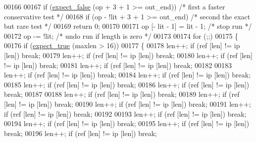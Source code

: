 \begin{DoxyCode}
00166 
00167           \textcolor{keywordflow}{if} (\hyperlink{lzf__c_8c_afc5fc140e1c36b6f0d3fc1699b038792}{expect\_false} (op + 3 + 1 >= out\_end)) \textcolor{comment}{/* first a faster conservative test */}
00168             \textcolor{keywordflow}{if} (op - !lit + 3 + 1 >= out\_end) \textcolor{comment}{/* second the exact but rare test */}
00169               \textcolor{keywordflow}{return} 0;
00170 
00171           op [- lit - 1] = lit - 1; \textcolor{comment}{/* stop run */}
00172           op -= !lit; \textcolor{comment}{/* undo run if length is zero */}
00173 
00174           \textcolor{keywordflow}{for} (;;)
00175             \{
00176               \textcolor{keywordflow}{if} (\hyperlink{lzf__c_8c_a6a6f76fb42528022b1fc8f9a1862e450}{expect\_true} (maxlen > 16))
00177                 \{
00178                   len++; \textcolor{keywordflow}{if} (ref [len] != ip [len]) \textcolor{keywordflow}{break};
00179                   len++; \textcolor{keywordflow}{if} (ref [len] != ip [len]) \textcolor{keywordflow}{break};
00180                   len++; \textcolor{keywordflow}{if} (ref [len] != ip [len]) \textcolor{keywordflow}{break};
00181                   len++; \textcolor{keywordflow}{if} (ref [len] != ip [len]) \textcolor{keywordflow}{break};
00182 
00183                   len++; \textcolor{keywordflow}{if} (ref [len] != ip [len]) \textcolor{keywordflow}{break};
00184                   len++; \textcolor{keywordflow}{if} (ref [len] != ip [len]) \textcolor{keywordflow}{break};
00185                   len++; \textcolor{keywordflow}{if} (ref [len] != ip [len]) \textcolor{keywordflow}{break};
00186                   len++; \textcolor{keywordflow}{if} (ref [len] != ip [len]) \textcolor{keywordflow}{break};
00187 
00188                   len++; \textcolor{keywordflow}{if} (ref [len] != ip [len]) \textcolor{keywordflow}{break};
00189                   len++; \textcolor{keywordflow}{if} (ref [len] != ip [len]) \textcolor{keywordflow}{break};
00190                   len++; \textcolor{keywordflow}{if} (ref [len] != ip [len]) \textcolor{keywordflow}{break};
00191                   len++; \textcolor{keywordflow}{if} (ref [len] != ip [len]) \textcolor{keywordflow}{break};
00192 
00193                   len++; \textcolor{keywordflow}{if} (ref [len] != ip [len]) \textcolor{keywordflow}{break};
00194                   len++; \textcolor{keywordflow}{if} (ref [len] != ip [len]) \textcolor{keywordflow}{break};
00195                   len++; \textcolor{keywordflow}{if} (ref [len] != ip [len]) \textcolor{keywordflow}{break};
00196                   len++; \textcolor{keywordflow}{if} (ref [len] != ip [len]) \textcolor{keywordflow}{break};

\end{DoxyCode}
